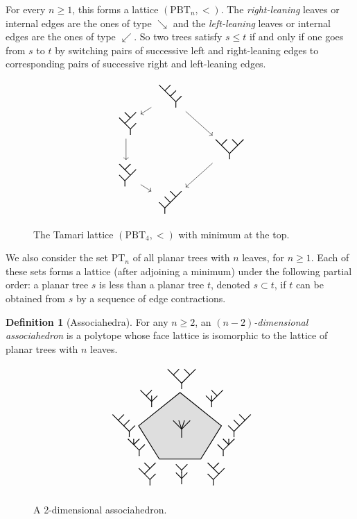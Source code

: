 \documentclass[11pt]{article}
\numberwithin{equation}{section}\providecommand{\No}{}
\theoremstyle{plain}
\theoremstyle{definition}
\newtheorem{definition}{Definition}
\newcommand{\Tam}[1]{\mathrm{PBT}_{#1}}
\newcommand{\PT}[1]{\mathrm{PT}_{#1}}
\newcommand{\TreeLL}
{\vcenter{\hbox{
\begin{tikzpicture}[yscale=0.2,xscale=0.2]
\draw[thick] (0,-1)--(0,0) -- (-3,3);
\draw[thick] (-1,1)--(0,2) ;
\draw[thick] (-2,2)--(-1,3) ;
\draw[thick] (0,0)--(1,1) ;
\draw [fill] (0,-1) circle [radius=0.035];
\draw [fill] (-2,2) circle [radius=0.035];
\draw [fill] (0,2) circle [radius=0.035];
\draw [fill] (1,1) circle [radius=0.035];
\draw [fill] (-3,3) circle [radius=0.035];
\draw [fill] (-1,3) circle [radius=0.035];
\end{tikzpicture}}}}
\newcommand{\TreeLR}
{\vcenter{\hbox{
\begin{tikzpicture}[yscale=0.2,xscale=0.2]
\draw[thick] (0,-1)--(0,0) -- (-2,2);
\draw[thick] (-1,1)--(1,3) ;
\draw[thick] (0,0)--(1,1) ;
\draw[thick] (0,2)--(-1,3) ;
\draw [fill] (0,-1) circle [radius=0.035];
\draw [fill] (-2,2) circle [radius=0.035];
\draw [fill] (0,2) circle [radius=0.035];
\draw [fill] (1,1) circle [radius=0.035];
\draw [fill] (-1,3) circle [radius=0.035];
\draw [fill] (1,3) circle [radius=0.035];
\end{tikzpicture}}}}
\newcommand{\TreeRR}
{\vcenter{\hbox{
\begin{tikzpicture}[yscale=0.2,xscale=0.2]
\draw[thick] (0,-1)--(0,0) -- (3,3);
\draw[thick] (1,1)--(0,2) ;
\draw[thick] (2,2)--(1,3) ;
\draw[thick] (0,0)--(-1,1) ;
\draw [fill] (0,-1) circle [radius=0.035];
\draw [fill] (2,2) circle [radius=0.035];
\draw [fill] (0,2) circle [radius=0.035];
\draw [fill] (-1,1) circle [radius=0.035];
\draw [fill] (3,3) circle [radius=0.035];
\draw [fill] (1,3) circle [radius=0.035];
\end{tikzpicture}}}}
\newcommand{\TreeRL}
{\vcenter{\hbox{
\begin{tikzpicture}[yscale=0.2,xscale=0.2]
\draw[thick] (0,-1)--(0,0) -- (2,2);
\draw[thick] (1,1)--(-1,3) ;
\draw[thick] (0,0)--(-1,1) ;
\draw[thick] (0,2)--(1,3) ;
\draw [fill] (0,-1) circle [radius=0.035];
\draw [fill] (2,2) circle [radius=0.035];
\draw [fill] (0,2) circle [radius=0.035];
\draw [fill] (-1,1) circle [radius=0.035];
\draw [fill] (1,3) circle [radius=0.035];
\draw [fill] (-1,3) circle [radius=0.035];
\end{tikzpicture}}}}
\newcommand{\TreeCC}
{\vcenter{\hbox{
\begin{tikzpicture}[yscale=0.2,xscale=0.2]
\draw[thick] (0,-1)--(0,0) -- (-2.5,2.5);
\draw[thick] (-1.5,1.5)--(-0.5,2.5) ;
\draw[thick] (1.5,1.5)--(0.5,2.5) ;
\draw[thick] (0,0)--(2.5,2.5) ;
\draw [fill] (0,-1) circle [radius=0.035];
\draw [fill] (-2.5,2.5) circle [radius=0.035];
\draw [fill] (-0.5,2.5) circle [radius=0.035];
\draw [fill] (0.5,2.5) circle [radius=0.035];
\draw [fill] (2.5,2.5) circle [radius=0.035];
\end{tikzpicture}}}}
\newcommand{\TreeAL}
{\vcenter{\hbox{
\begin{tikzpicture}[yscale=0.2,xscale=0.2]
\draw[thick] (0,-1)--(0,0) -- (-2,2);
\draw[thick] (-1,1)--(0,2) ;
\draw[thick] (0,0)--(1,1) ;
\draw[thick] (-1,1)--(-1,2) ;
\draw [fill] (0,-1) circle [radius=0.035];
\draw [fill] (-2,2) circle [radius=0.035];
\draw [fill] (0,2) circle [radius=0.035];
\draw [fill] (1,1) circle [radius=0.035];
\draw [fill] (-1,2) circle [radius=0.035];
\end{tikzpicture}}}}
\newcommand{\TreeRA}
{\vcenter{\hbox{
\begin{tikzpicture}[yscale=0.2,xscale=0.2]
\draw[thick] (0,-1)--(0,0) -- (2,2);
\draw[thick] (1,1)--(0,2) ;
\draw[thick] (0,0)--(-1,1) ;
\draw[thick] (1,1)--(1,2) ;
\draw [fill] (0,-1) circle [radius=0.035];
\draw [fill] (2,2) circle [radius=0.035];
\draw [fill] (0,2) circle [radius=0.035];
\draw [fill] (-1,1) circle [radius=0.035];
\draw [fill] (1,2) circle [radius=0.035];
\end{tikzpicture}}}}
\newcommand{\TreeAR}
{\vcenter{\hbox{
\begin{tikzpicture}[yscale=0.2,xscale=0.2]
\draw[thick] (0,-1)--(0,0) -- (2,2);
\draw[thick] (1,1)--(0,2) ;
\draw[thick] (0,0)--(-1,1) ;
\draw[thick] (0,0)--(0,1) ;
\draw [fill] (0,-1) circle [radius=0.035];
\draw [fill] (2,2) circle [radius=0.035];
\draw [fill] (0,2) circle [radius=0.035];
\draw [fill] (-1,1) circle [radius=0.035];
\draw [fill] (0,1) circle [radius=0.035];
\end{tikzpicture}}}}
\newcommand{\TreeLA}
{\vcenter{\hbox{
\begin{tikzpicture}[yscale=0.2,xscale=0.2]
\draw[thick] (0,-1)--(0,0) -- (-2,2);
\draw[thick] (-1,1)--(0,2) ;
\draw[thick] (0,0)--(1,1) ;
\draw[thick] (0,0)--(0,1) ;
\draw [fill] (0,-1) circle [radius=0.035];
\draw [fill] (-2,2) circle [radius=0.035];
\draw [fill] (0,2) circle [radius=0.035];
\draw [fill] (1,1) circle [radius=0.035];
\draw [fill] (0,1) circle [radius=0.035];
\end{tikzpicture}}}}
\newcommand{\TreeCA}
{\vcenter{\hbox{
\begin{tikzpicture}[yscale=0.2,xscale=0.2]
\draw[thick] (0,-1)--(0,0) -- (-1,1);
\draw[thick] (0,1.5)--(1,2.5) ;
\draw[thick] (0,1.5)--(-1,2.5) ;
\draw[thick] (0,0)--(1,1) ;
\draw[thick] (0,0)--(0,1.5) ;
\draw [fill] (0,-1) circle [radius=0.035];
\draw [fill] (-1,1) circle [radius=0.035];
\draw [fill] (1,2.5) circle [radius=0.035];
\draw [fill] (-1,2.5) circle [radius=0.035];
\draw [fill] (1,1) circle [radius=0.035];
\draw [fill] (0,1) circle [radius=0.035];
\end{tikzpicture}}}}
\newcommand{\TreeC}
{\vcenter{\hbox{
\begin{tikzpicture}[yscale=0.2,xscale=0.2]
\draw[thick] (0,-1.5)--(0,0);
\draw[thick] (0,0)--(1.5,1.5) ;
\draw[thick] (0,0)--(0.5,1.5) ;
\draw[thick] (0,0)--(-0.5,1.5) ;
\draw[thick] (0,0)--(-1.5,1.5) ;
\draw [fill] (0,-1.5) circle [radius=0.035];
\draw [fill] (1.5,1.5) circle [radius=0.035];
\draw [fill] (0.5,1.5) circle [radius=0.035];
\draw [fill] (-1.5,1.5) circle [radius=0.035];
\draw [fill] (-0.5,1.5) circle [radius=0.035];
\end{tikzpicture}}}}
\begin{document}
For every $n\geq 1$, this forms a lattice $(\Tam{n}, <)$. The
\emph{right-leaning} leaves or internal edges are the ones of type $\searrow$ and
the \emph{left-leaning} leaves or internal edges are the ones of type $\swarrow$. So two trees satisfy $s\leq t$ if and only if one goes from $s$ to $t$ by switching
pairs of successive left and right-leaning edges to
corresponding pairs
of successive right and left-leaning edges.

\begin{figure}[htb]
\[\vcenter{\hbox{
\begin{tikzcd}[column sep=0.4cm, row sep=-0.1cm]
& \TreeLL\arrow[rrdd, thin]\arrow[ld, thin]&& \\
\TreeLR\arrow[dd, thin]& && \\
& && \TreeCC \arrow[ldld, thin]\\
\TreeRL\arrow[rd, thin]& && \\
&\TreeRR &&
\end{tikzcd}
}}\]
\caption{The Tamari lattice $(\mathrm{PBT}_{4}, <)$ with minimum at the top.}
\end{figure}

We also consider the set $\PT{n}$ of all planar trees with $n$ leaves, for $n\geq 1$.
Each of these sets forms a lattice (after adjoining a minimum) under the following partial order: a planar tree $s$ is less than a planar tree $t$, denoted $s\subset t$,
if $t$ can be obtained from $s$ by a sequence of edge contractions.

\begin{definition}[Associahedra]
For any $n\geq 2$, an \emph{$(n-2)$-dimensional associahedron} is a polytope whose face lattice is isomorphic to the lattice of planar trees with $n$ leaves.
\begin{figure}[htb]
\[
\begin{tikzpicture}[scale=0.3]
\draw[thick] (-5,0)--(0,4)--(5,0)--(2.5,-4)--(-2.5,-4)--cycle;
\draw[fill, opacity=0.12] (-5,0)--(0,4)--(5,0)--(2.5,-4)--(-2.5,-4)--cycle;
\draw (-5,0) node[left] {$\TreeLL$};
\draw (5,0) node[right] {$\TreeRR$};
\draw (0,4) node[above] {$\TreeCC$};
\draw (-2.5,-4) node[below left] {$\TreeLR$};
\draw (2.5,-4) node[below right] {$\TreeRL$};
\draw (-3.8,-2.6) node[left] {$\TreeAL$};
\draw (3.7,-2.6) node[right] {$\TreeRA$};
\draw (-2.3,1.8) node[above left] {$\TreeLA$};
\draw (2.3,1.8) node[above right] {$\TreeAR$};
\draw (0,-4.2) node[below] {$\TreeCA$};
\draw (0,-0.4) node {$\TreeC$};
\end{tikzpicture}
\]
\caption{A 2-dimensional associahedron.}
\end{figure}
\end{definition}
\end{document}
